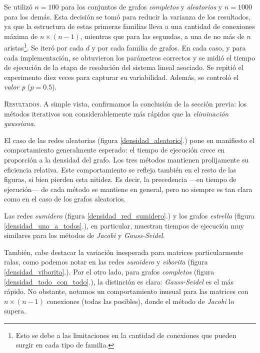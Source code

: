 Se utilizó $n = 100$ para los conjuntos de grafos \textit{completos} y \textit{aleatorios} y $n = 1000$ para los demás. Esta decisión se tomó para reducir la varianza de los resultados, ya que la estructura de estas primeras familias lleva a una cantidad de conexiones máxima de $n \times (n - 1)$, mientras que para las segundas, a una de no más de $n$ aristas\footnote{Esto se debe a las limitaciones en la cantidad de conexiones que pueden surgir en cada tipo de familia.}.  Se iteró por cada $d$ y por cada familia de grafos. En cada caso, y para cada implementación, se obtuvieron los parámetros correctos y se midió el tiempo de ejecución de la etapa de resolución del sistema lineal asociado. Se repitió el experimento diez veces para capturar su variabilidad. Además, se controló el \textit{valor p} ($p = 0.5$).

\vspace{1.5em}
\noindent\textsc{Resultados}. A simple vista, confirmamos la conclusión de la sección previa: los métodos iterativos son considerablemente más rápidos que la \textit{eliminación gaussiana}.

\vspace{1em}
El caso de las redes aleatorias (figura \ref{densidad_aleatorio}.) pone en manifiesto el comportamiento generalmente esperado: 
el tiempo de ejecución crece en proporción a la densidad del grafo. Los tres métodos mantienen prolijamente su eficiencia relativa.
Este comportamiento se refleja también en el resto de las figuras, si bien pierden esta nitidez.
Es decir, la precedencia ---en tiempo de ejecución--- de cada método se mantiene en general, pero no siempre es tan clara como en el caso de los grafos aleatorios.

\vspace{1em}
Las redes \textit{sumidero} (figura \ref{densidad_red_sumidero}.) y los grafos \textit{estrella} (figura \ref{densidad_uno_a_todos}.), en particular,
muestran tiempos de ejecución muy similares para los métodos de \textit{Jacobi} y \textit{Gauss-Seidel}.

También, cabe destacar la variación inesperada para matrices particularmente ralas, como podemos notar en las redes \textit{sumidero} y \textit{viborita} (figura \ref{densidad_viborita}.).
Por el otro lado, para grafos \textit{completos} (figura \ref{densidad_todo_con_todo}.), la distinción es clara: \textit{Gauss-Seidel} es el más rápido. No obstante, notamos un comportamiento inusual para las matrices con $n \times (n - 1)$ conexiones (todas las posibles), donde el método de \textit{Jacobi} lo supera.


